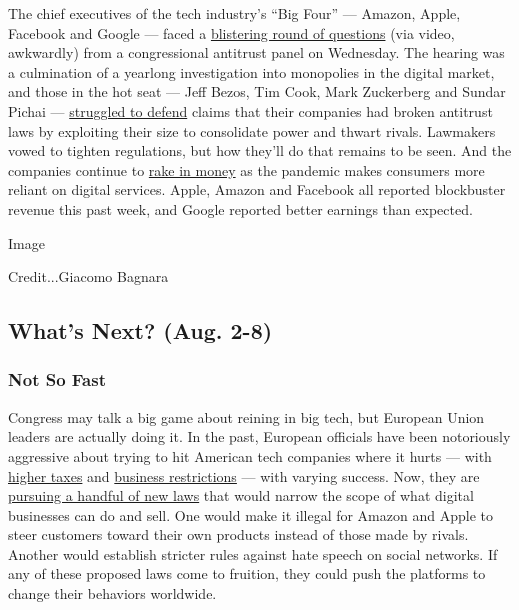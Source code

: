 The chief executives of the tech industry's ``Big Four'' --- Amazon,
Apple, Facebook and Google --- faced a
\href{https://www.nytimes3xbfgragh.onion/2020/07/29/technology/big-tech-hearing-apple-amazon-facebook-google.html}{blistering
round of questions} (via video, awkwardly) from a congressional
antitrust panel on Wednesday. The hearing was a culmination of a
yearlong investigation into monopolies in the digital market, and those
in the hot seat --- Jeff Bezos, Tim Cook, Mark Zuckerberg and Sundar
Pichai ---
\href{https://www.nytimes3xbfgragh.onion/2020/07/30/technology/big-tech-ceos.html}{struggled
to defend} claims that their companies had broken antitrust laws by
exploiting their size to consolidate power and thwart rivals. Lawmakers
vowed to tighten regulations, but how they'll do that remains to be
seen. And the companies continue to
\href{https://www.nytimes3xbfgragh.onion/2020/07/30/technology/tech-company-earnings-amazon-apple-facebook-google.html}{rake
in money} as the pandemic makes consumers more reliant on digital
services. Apple, Amazon and Facebook all reported blockbuster revenue
this past week, and Google reported better earnings than expected.

Image

Credit...Giacomo Bagnara

\hypertarget{whats-next-aug-2-8}{%
\subsection{What's Next? (Aug. 2-8)}\label{whats-next-aug-2-8}}

\hypertarget{not-so-fast}{%
\subsubsection{Not So Fast}\label{not-so-fast}}

Congress may talk a big game about reining in big tech, but European
Union leaders are actually doing it. In the past, European officials
have been notoriously aggressive about trying to hit American tech
companies where it hurts --- with
\href{https://www.nytimes3xbfgragh.onion/2020/01/23/business/tech-taxes-debate.html}{higher
taxes} and
\href{https://www.nytimes3xbfgragh.onion/2018/07/18/technology/google-eu-android-fine.html}{business
restrictions} --- with varying success. Now, they are
\href{https://www.nytimes3xbfgragh.onion/2020/07/30/technology/europe-new-phase-tech-amazon-apple-facebook-google.html}{pursuing
a handful of new laws} that would narrow the scope of what digital
businesses can do and sell. One would make it illegal for Amazon and
Apple to steer customers toward their own products instead of those made
by rivals. Another would establish stricter rules against hate speech on
social networks. If any of these proposed laws come to fruition, they
could push the platforms to change their behaviors worldwide.

